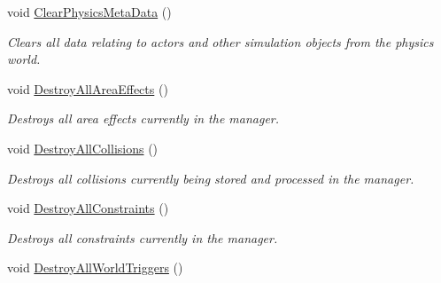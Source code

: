 \begin{DoxyCompactItemize}
void \hyperlink{classMezzanine_1_1PhysicsManager_a82fc7833487bbc792a671b032cfd7a6b}{ClearPhysicsMetaData} ()
\begin{DoxyCompactList}\small\item\em Clears all data relating to actors and other simulation objects from the physics world. \item\end{DoxyCompactList}\item 
\hypertarget{classMezzanine_1_1PhysicsManager_ad1717a3bbf093c82909bc4af70641c7c}{
void \hyperlink{classMezzanine_1_1PhysicsManager_ad1717a3bbf093c82909bc4af70641c7c}{DestroyAllAreaEffects} ()}
\label{classMezzanine_1_1PhysicsManager_ad1717a3bbf093c82909bc4af70641c7c}

\begin{DoxyCompactList}\small\item\em Destroys all area effects currently in the manager. \item\end{DoxyCompactList}\item 
\hypertarget{classMezzanine_1_1PhysicsManager_a8a34856cf8da8448c5f148100163a995}{
void \hyperlink{classMezzanine_1_1PhysicsManager_a8a34856cf8da8448c5f148100163a995}{DestroyAllCollisions} ()}
\label{classMezzanine_1_1PhysicsManager_a8a34856cf8da8448c5f148100163a995}

\begin{DoxyCompactList}\small\item\em Destroys all collisions currently being stored and processed in the manager. \item\end{DoxyCompactList}\item 
void \hyperlink{classMezzanine_1_1PhysicsManager_a8f127a13daa6fc9bbd3bf0e0237239fe}{DestroyAllConstraints} ()
\begin{DoxyCompactList}\small\item\em Destroys all constraints currently in the manager. \item\end{DoxyCompactList}\item 
\hypertarget{classMezzanine_1_1PhysicsManager_a91386ac53ea08838f8e733459a2f3b74}{
void \hyperlink{classMezzanine_1_1PhysicsManager_a91386ac53ea08838f8e733459a2f3b74}{DestroyAllWorldTriggers} ()}
\label{classMezzanine_1_1PhysicsManager_a91386ac53ea08838f8e733459a2f3b74}


\end{DoxyCompactItemize}
